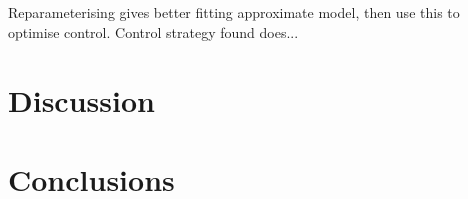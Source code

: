 Reparameterising gives better fitting approximate model, then use this to optimise control. Control strategy found does...

\begin{figure}
    \begin{center}
        \caption[Globally optimal strategy]{\label{fig:ch5:Global_optimal}}
    \end{center}
\end{figure}

\section{Discussion\label{sec:ch5:discussion}}

\section{Conclusions\label{sec:ch5:conclusions}}